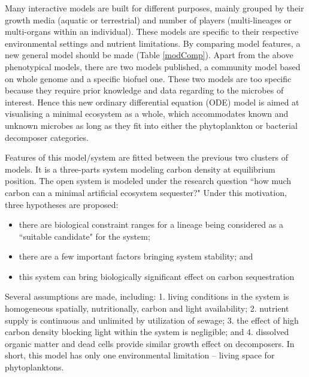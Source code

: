 \documentclass[../thesis.tex]{subfiles} %
\begin{document}
Many interactive models are built for different purposes, mainly grouped by their growth media (aquatic or terrestrial) and number of players (multi-lineages or multi-organs within an individual).  These models are specific to their respective environmental settings and nutrient limitations.  By comparing model features, a new general model should be made (Table \ref{modComp}).  Apart from the above phenotypical models, there are two models published, a community model based on whole genome\autocite{harcombe2014metabolic} and a specific biofuel\autocite{kirthiga2014mathematical} one.  These two models are too specific because they require prior knowledge and data regarding to the microbes of interest.  Hence this new ordinary differential equation (ODE) model is aimed at visualising a minimal ecosystem as a whole, which accommodates known and unknown microbes as long as they fit into either the phytoplankton or bacterial decomposer categories.

Features of this model/system are fitted between the previous two clusters of models.  It is a three-parts system modeling carbon density at equilibrium position.  The open system is modeled under the research question ``how much carbon can a minimal artificial ecosystem sequester?"  Under this motivation, three hypotheses are proposed:
\begin{itemize}
    \item there are biological constraint ranges for a lineage being considered as a ``suitable candidate" for the system;
    \item there are a few important factors bringing system stability; and
    \item this system can bring biologically significant effect on carbon sequestration
\end{itemize} %

Several assumptions are made, including: 1. living conditions in the system is homogeneous spatially, nutritionally, carbon and light availability; 2. nutrient supply is continuous and unlimited by utilization of sewage;\autocite{markou2014microalgal} 3. the effect of high carbon density blocking light within the system is negligible; and 4. dissolved organic matter and dead cells provide similar growth effect on decomposers.  In short, this model has only one environmental limitation -- living space for phytoplanktons. %
\end{document}
